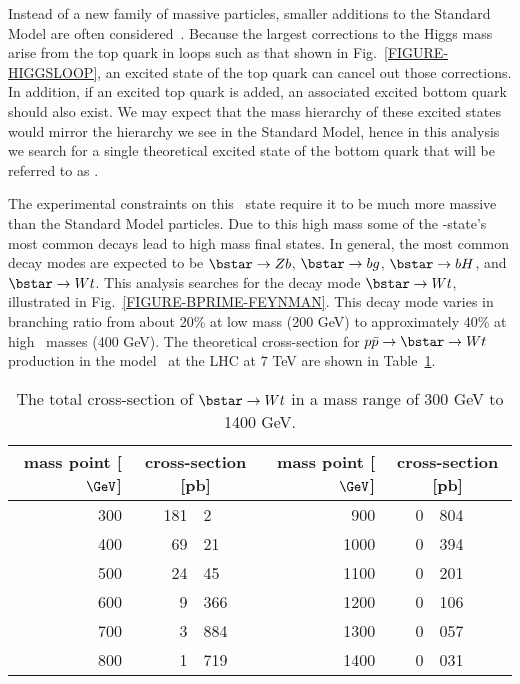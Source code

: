 Instead of a new family of massive particles, smaller additions to the Standard Model are often considered~\cite{Nutter}. Because the largest corrections to the Higgs mass arise from the top quark in loops such as that shown in Fig.~\ref{FIGURE-HIGGSLOOP}, an excited state of the top quark can cancel out those corrections. In addition, if an excited top quark is added, an associated excited bottom quark should also exist. We may expect that the mass hierarchy of these excited states would mirror the hierarchy we see in the Standard Model, hence in this analysis we search for a single theoretical excited state of the bottom quark that will be referred to as \bstar. 


The experimental constraints on this \bstar\ state require it to be much more massive than the Standard Model particles. Due to this high mass some of the \bstar-state's most common decays lead to high mass final states. In general, the most common decay modes are expected to be $\bstar \to Zb$, $\bstar \to bg$, $\bstar \to bH$, and $\bstar \to Wt$. This analysis searches for the decay mode $\bstar \to Wt$, illustrated in Fig.~\ref{FIGURE-BPRIME-FEYNMAN}. This decay mode varies in branching ratio from about 20\% at low mass (200 GeV) to approximately 40\% at high \bstar\ masses (400 GeV). The theoretical cross-section for $p\bar{p} \to \bstar \to Wt$ production in the model~\cite{Nutter} at the LHC at 7 TeV are shown in Table~\ref{BprimeCrossSection}.

\begin{table}[htdp]
\begin{center}
\begin{tabular}{r r@{.}l|r r@{.}l}  \hline \hline
mass point [$\GeV$] & \multicolumn{2}{c}{cross-section [pb]} & mass point [$\GeV$] & \multicolumn{2}{c}{cross-section [pb]}\\
\hline
300 & 181&2& 900 & 0&804  \\
400 & 69&21& 1000& 0&394  \\
500 & 24&45& 1100& 0&201  \\
600 & 9&366& 1200& 0&106  \\
700 & 3&884& 1300& 0&057 \\
800 & 1&719& 1400& 0&031 \\
\hline\hline
\end{tabular}
\caption{The total cross-section of $\bstar \rightarrow Wt$ in a mass range of 300 GeV to 1400 GeV.}
\label{BprimeCrossSection}
\end{center}
\end{table}

